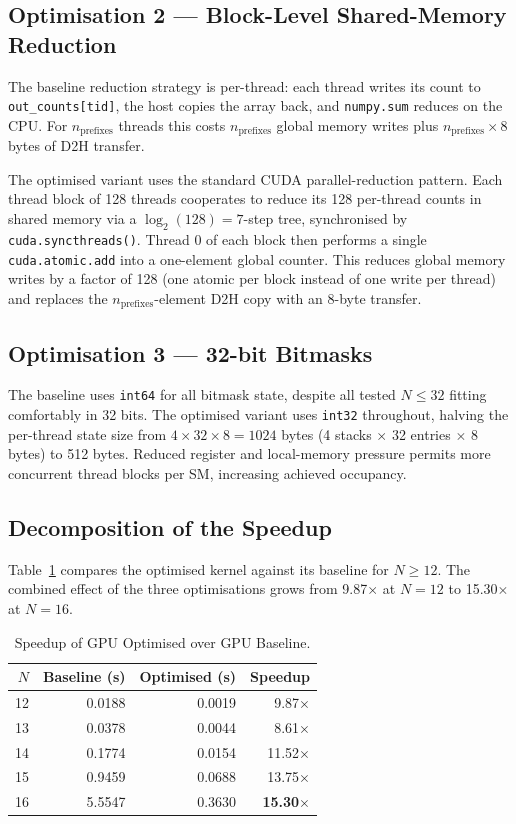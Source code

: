 \documentclass[12pt, letterpaper]{article}
\begin{document}
\subsection{Optimisation 2 --- Block-Level Shared-Memory Reduction}

The baseline reduction strategy is per-thread: each thread writes its count to \texttt{out\_counts[tid]}, the host copies the array back, and \texttt{numpy.sum} reduces on the CPU. For $n_{\text{prefixes}}$ threads this costs $n_{\text{prefixes}}$ global memory writes plus $n_{\text{prefixes}} \times 8$ bytes of D2H transfer.

The optimised variant uses the standard CUDA parallel-reduction pattern. Each thread block of 128 threads cooperates to reduce its 128 per-thread counts in shared memory via a $\log_2 (128) = 7$-step tree, synchronised by \texttt{cuda.syncthreads()}. Thread 0 of each block then performs a single \texttt{cuda.atomic.add} into a one-element global counter. This reduces global memory writes by a factor of 128 (one atomic per block instead of one write per thread) and replaces the $n_{\text{prefixes}}$-element D2H copy with an 8-byte transfer.

\subsection{Optimisation 3 --- 32-bit Bitmasks}

The baseline uses \texttt{int64} for all bitmask state, despite all tested $N \leq 32$ fitting comfortably in 32 bits. The optimised variant uses \texttt{int32} throughout, halving the per-thread state size from $4 \times 32 \times 8 = 1024$ bytes (4 stacks $\times$ 32 entries $\times$ 8 bytes) to 512 bytes. Reduced register and local-memory pressure permits more concurrent thread blocks per SM, increasing achieved occupancy.

\subsection{Decomposition of the Speedup}

Table~\ref{tab:opt_decomp} compares the optimised kernel against its baseline for $N \geq 12$. The combined effect of the three optimisations grows from 9.87$\times$ at $N = 12$ to 15.30$\times$ at $N = 16$.

\begin{table}[H]
\centering
\caption{Speedup of GPU Optimised over GPU Baseline.}
\begin{tabular}{@{}rrrr@{}}
\toprule
$N$ & \textbf{Baseline (s)} & \textbf{Optimised (s)} & \textbf{Speedup} \\
\midrule
12 & 0.0188 & 0.0019 & 9.87$\times$ \\
13 & 0.0378 & 0.0044 & 8.61$\times$ \\
14 & 0.1774 & 0.0154 & 11.52$\times$ \\
15 & 0.9459 & 0.0688 & 13.75$\times$ \\
16 & 5.5547 & 0.3630 & \textbf{15.30$\times$} \\
\bottomrule
\end{tabular}
\label{tab:opt_decomp}
\end{table}
\end{document}
